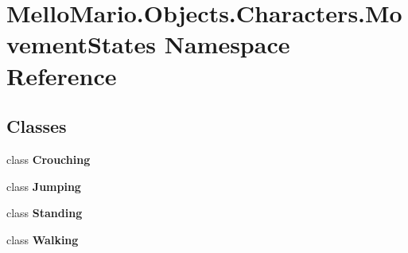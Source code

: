 \section{Mello\+Mario.\+Objects.\+Characters.\+Movement\+States Namespace Reference}
\label{namespaceMelloMario_1_1Objects_1_1Characters_1_1MovementStates}
\subsection*{Classes}
\begin{DoxyCompactItemize}
\item 
class \textbf{ Crouching}
\item 
class \textbf{ Jumping}
\item 
class \textbf{ Standing}
\item 
class \textbf{ Walking}
\end{DoxyCompactItemize}
